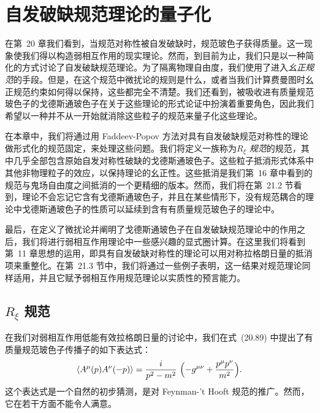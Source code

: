 \chapter{自发破缺规范理论的量子化}

在第~20 章我们看到，当规范对称性被自发破缺时，规范玻色子获得质量。这一现象使我们得以构造弱相互作用的现实理论。然而，到目前为止，我们只是以一种简化的方式讨论了自发破缺规范理论。为了隔离物理自由度，我们使用了进入\emph{幺正规范}的手段。但是，在这个规范中微扰论的规则是什么，或者当我们计算费曼图时幺正规范约束如何得以保持，这些都完全不清楚。我们还看到，被吸收进有质量规范玻色子的戈德斯通玻色子在关于这些理论的形式论证中扮演着重要角色，因此我们希望以一种并不从一开始就消除这些粒子的规范来量子化这些理论。

在本章中，我们将通过用 Faddeev-Popov 方法对具有自发破缺规范对称性的理论做形式化的规范固定，来处理这些问题。我们将定义一族称为\emph{$R_\xi$ 规范}的规范，其中几乎全部包含原始自发对称性破缺的戈德斯通玻色子。这些粒子抵消形式体系中其他非物理粒子的效应，以保持理论的幺正性。这些抵消是我们第~16 章中看到的规范与鬼场自由度之间抵消的一个更精细的版本。然而，我们将在第~21.2 节看到，理论不会忘记它含有戈德斯通玻色子，并且在某些情形下，没有规范耦合的理论中戈德斯通玻色子的性质可以延续到含有有质量规范玻色子的理论中。

最后，在定义了微扰论并阐明了戈德斯通玻色子在自发破缺规范理论中的作用之后，我们将进行弱相互作用理论中一些感兴趣的显式圈计算。在这里我们将看到第~11 章思想的运用，即具有自发破缺对称性的理论可以用对称拉格朗日量的抵消项来重整化。在第~21.3 节中，我们将通过一些例子表明，这一结果对规范理论同样适用，并且它赋予弱相互作用规范理论以实质性的预言能力。

\section{$R_\xi$ 规范}

在我们对弱相互作用低能有效拉格朗日量的讨论中，我们在式~(20.89) 中提出了有质量规范玻色子传播子的如下表达式：
\begin{equation}
  \langle A^\mu(p)A^\nu(-p)\rangle = \frac{i}{p^2 - m^2}\ \Bigl(
    -g^{\mu\nu} + \frac{p^\mu p^\nu}{m^2} \Bigr) .
  \label{eq:21.1}
\end{equation}
这个表达式是一个自然的初步猜测，是对 Feynman-'t Hooft 规范的推广。然而，它在若干方面不能令人满意。

